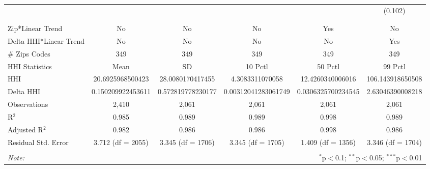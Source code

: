 \begin{table}[H]
{\begin{tabular}{@{\extracolsep{5pt}}lccccc}
   &  &  &  &  & (0.102) \\  

   & & & & & \\  

 \hline \\[-1.8ex]  

 Zip*Linear Trend & No & No & No & Yes & No \\  

 Delta HHI*Linear Trend & No & No & No & No & Yes \\  

 # Zips Codes & 349 & 349 & 349 & 349 & 349 \\  

 HHI Statistics & Mean & SD & 10 Pctl & 50 Pctl & 99 Pctl \\  

 HHI & 20.6925968500423 & 28.0080170417455 & 4.3083311070058 & 12.4260340006016 & 106.143918650508 \\  

 Delta HHI & 0.150209922453611 & 0.572819778230177 & 0.00312041283061749 & 0.0306325700234545 & 2.63046390008218 \\  

 Observations & 2,410 & 2,061 & 2,061 & 2,061 & 2,061 \\  

 R$^{2}$ & 0.985 & 0.989 & 0.989 & 0.998 & 0.989 \\  

 Adjusted R$^{2}$ & 0.982 & 0.986 & 0.986 & 0.998 & 0.986 \\  

 Residual Std. Error & 3.712 (df = 2055) & 3.345 (df = 1706) & 3.345 (df = 1705) & 1.409 (df = 1356) & 3.346 (df = 1704) \\  

 \hline  

 \hline \\[-1.8ex]  

 \textit{Note:}  & \multicolumn{5}{r}{$^{*}$p$<$0.1; $^{**}$p$<$0.05; $^{***}$p$<$0.01} \\  

 \end{tabular}}  

 \end{table}  

 



